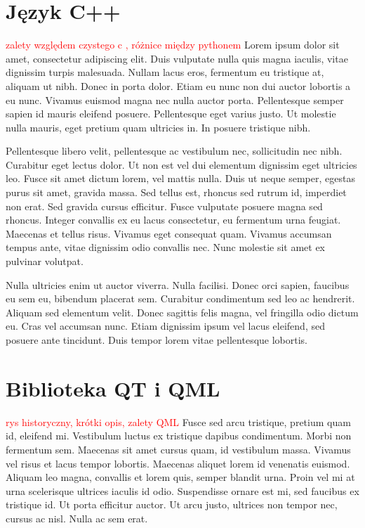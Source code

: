 \documentclass[12pt, eng, twoside, openany, final]{mgr}
\begin{document}
    \section{Język C++}
       \textcolor{red}{zalety względem czystego c , różnice między pythonem}
       Lorem ipsum dolor sit amet, consectetur adipiscing elit. Duis vulputate nulla quis magna iaculis, vitae dignissim turpis malesuada. Nullam lacus eros, fermentum eu tristique at, aliquam ut nibh. Donec in porta dolor. Etiam eu nunc non dui auctor lobortis a eu nunc. Vivamus euismod magna nec nulla auctor porta. Pellentesque semper sapien id mauris eleifend posuere. Pellentesque eget varius justo. Ut molestie nulla mauris, eget pretium quam ultricies in. In posuere tristique nibh.

    Pellentesque libero velit, pellentesque ac vestibulum nec, sollicitudin nec nibh. Curabitur eget lectus dolor. Ut non est vel dui elementum dignissim eget ultricies leo. Fusce sit amet dictum lorem, vel mattis nulla. Duis ut neque semper, egestas purus sit amet, gravida massa. Sed tellus est, rhoncus sed rutrum id, imperdiet non erat. Sed gravida cursus efficitur. Fusce vulputate posuere magna sed rhoncus. Integer convallis ex eu lacus consectetur, eu fermentum urna feugiat. Maecenas et tellus risus. Vivamus eget consequat quam. Vivamus accumsan tempus ante, vitae dignissim odio convallis nec. Nunc molestie sit amet ex pulvinar volutpat.

    Nulla ultricies enim ut auctor viverra. Nulla facilisi. Donec orci sapien, faucibus eu sem eu, bibendum placerat sem. Curabitur condimentum sed leo ac hendrerit. Aliquam sed elementum velit. Donec sagittis felis magna, vel fringilla odio dictum eu. Cras vel accumsan nunc. Etiam dignissim ipsum vel lacus eleifend, sed posuere ante tincidunt. Duis tempor lorem vitae pellentesque lobortis.
    
    \section{Biblioteka QT i QML}
    \textcolor{red}{rys historyczny, krótki opis, zalety QML}
    Fusce sed arcu tristique, pretium quam id, eleifend mi. Vestibulum luctus ex tristique dapibus condimentum. Morbi non fermentum sem. Maecenas sit amet cursus quam, id vestibulum massa. Vivamus vel risus et lacus tempor lobortis. Maecenas aliquet lorem id venenatis euismod. Aliquam leo magna, convallis et lorem quis, semper blandit urna. Proin vel mi at urna scelerisque ultrices iaculis id odio. Suspendisse ornare est mi, sed faucibus ex tristique id. Ut porta efficitur auctor. Ut arcu justo, ultrices non tempor nec, cursus ac nisl. Nulla ac sem erat.
\end{document}

